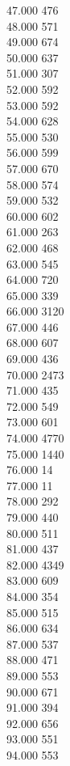{ 47.000	476 \\
 48.000	571 \\
 49.000	674 \\
 50.000	637 \\
 51.000	307 \\
 52.000	592 \\
 53.000	592 \\
 54.000	628 \\
 55.000	530 \\
 56.000	599 \\
 57.000	670 \\
 58.000	574 \\
 59.000	532 \\
 60.000	602 \\
 61.000	263 \\
 62.000	468 \\
 63.000	545 \\
 64.000	720 \\
 65.000	339 \\
 66.000	3120 \\
 67.000	446 \\
 68.000	607 \\
 69.000	436 \\
 70.000	2473 \\
 71.000	435 \\
 72.000	549 \\
 73.000	601 \\
 74.000	4770 \\
 75.000	1440 \\
 76.000	14 \\
 77.000	11 \\
 78.000	292 \\
 79.000	440 \\
 80.000	511 \\
 81.000	437 \\
 82.000	4349 \\
 83.000	609 \\
 84.000	354 \\
 85.000	515 \\
 86.000	634 \\
 87.000	537 \\
 88.000	471 \\
 89.000	553 \\
 90.000	671 \\
 91.000	394 \\
 92.000	656 \\
 93.000	551 \\
 94.000	553 \\
}

